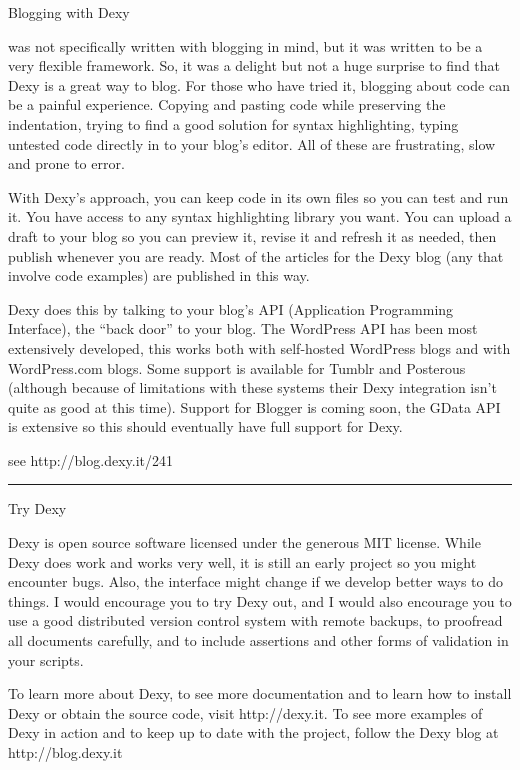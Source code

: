\documentclass[custom, plainsections]{sciposter}
\begin{document}
\begin{multicols*}{3}
\large
Blogging with Dexy
\vspace{5pt}
\small

 was not specifically written with blogging in mind, but it was written to be a very flexible framework. So, it was a delight but not a huge surprise to find that Dexy is a great way to blog. For those who have tried it, blogging about code can be a painful experience. Copying and pasting code while preserving the indentation, trying to find a good solution for syntax highlighting, typing untested code directly in to your blog's editor. All of these are frustrating, slow and prone to error.

With Dexy's approach, you can keep code in its own files so you can test and run it. You have access to any syntax highlighting library you want. You can upload a draft to your blog so you can preview it, revise it and refresh it as needed, then publish whenever you are ready. Most of the articles for the Dexy blog (any that involve code examples) are published in this way.

Dexy does this by talking to your blog's API (Application Programming Interface), the ``back door'' to your blog. The WordPress API has been most extensively developed, this works both with self-hosted WordPress blogs and with WordPress.com blogs. Some support is available for Tumblr and Posterous (although because of limitations with these systems their Dexy integration isn't quite as good at this time). Support for Blogger is coming soon, the GData API is extensive so this should eventually have full support for Dexy. 

see http://blog.dexy.it/241

\vspace{10pt}
\hrule
\vspace{10pt}

\large
Try Dexy
\vspace{5pt}
\small

Dexy is open source software licensed under the generous MIT license. While Dexy does work and works very well, it is still an early project so you might encounter bugs. Also, the interface might change if we develop better ways to do things. I would encourage you to try Dexy out, and I would also encourage you to use a good distributed version control system with remote backups, to proofread all documents carefully, and to include assertions and other forms of validation in your scripts.

To learn more about Dexy, to see more documentation and to learn how to install Dexy or obtain the source code, visit http://dexy.it.  To see more examples of Dexy in action and to keep up to date with the project, follow the Dexy blog at http://blog.dexy.it


\end{multicols*}
\end{document}
